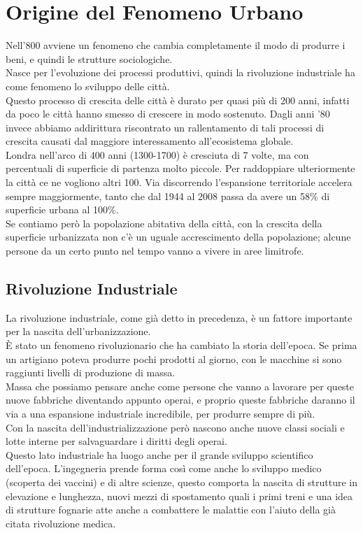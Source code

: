\documentclass[a4paper,12pt, oneside]{book}
\begin{document}
\chapter{Origine del Fenomeno Urbano}
Nell'800 avviene un fenomeno che cambia completamente il modo di produrre i beni, e quindi le strutture sociologiche.\\
Nasce per l'evoluzione dei processi produttivi, quindi la rivoluzione industriale ha come fenomeno lo sviluppo delle città.\\
Questo processo di crescita delle città è durato per quasi più di 200 anni, infatti da poco le città hanno smesso di crescere in modo sostenuto. Dagli anni '80 invece abbiamo addirittura riscontrato un rallentamento di tali processi di crescita causati dal maggiore interessamento all'ecosistema globale.\\
Londra nell'arco di 400 anni (1300-1700) è cresciuta di 7 volte, ma con percentuali di superficie di partenza molto piccole. Per raddoppiare ulteriormente la città ce ne vogliono altri 100. Via discorrendo l'espansione territoriale accelera sempre maggiormente, tanto che dal 1944 al 2008 passa da avere un 58\% di superficie urbana al 100\%.\\
Se contiamo però la popolazione abitativa della città, con la crescita della superficie urbanizzata non c'è un uguale accrescimento della popolazione; alcune persone da un certo punto nel tempo vanno a vivere in aree limitrofe.\\
\section{Rivoluzione Industriale}
La rivoluzione industriale, come già detto in precedenza, è un fattore importante per la nascita dell'urbanizzazione.\\
È stato un fenomeno rivoluzionario che ha cambiato la storia dell'epoca. Se prima un artigiano poteva produrre pochi prodotti al giorno, con le macchine si sono raggiunti livelli di produzione di massa.\\
Massa che possiamo pensare anche come persone che vanno a lavorare per queste nuove fabbriche diventando appunto operai, e proprio queste fabbriche daranno il via a una espansione industriale incredibile, per produrre sempre di più.\\
Con la nascita dell'industrializzazione però nascono anche nuove classi sociali e lotte interne per salvaguardare i diritti degli operai.\\
Questo lato industriale ha luogo anche per il grande sviluppo scientifico dell'epoca. L'ingegneria prende forma così come anche lo sviluppo medico (scoperta dei vaccini) e di altre scienze, questo comporta la nascita di strutture in elevazione e lunghezza, nuovi mezzi di spostamento quali i primi treni e una idea di strutture fognarie atte anche a combattere le malattie con l'aiuto della già citata rivoluzione medica.\\
\end{document}

